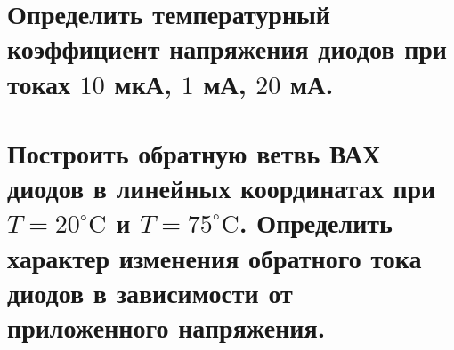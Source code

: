 \documentclass[12pt,a4paper]{article}
\theoremstyle{plain}
\theoremstyle{definition}
\theoremstyle{remark}
\numberwithin{equation}{section}
\begin{document}
\section{Определить температурный коэффициент напряжения диодов при токах $10$ мкА, $1$ мА, $20$ мА.}

\section{Построить обратную ветвь ВАХ диодов в линейных координатах при $T = 20^{\circ}\text{C}$ и 
$T = 75^{\circ}\text{C}$. Определить характер изменения обратного тока диодов в 
зависимости от приложенного напряжения.}
\end{document}
